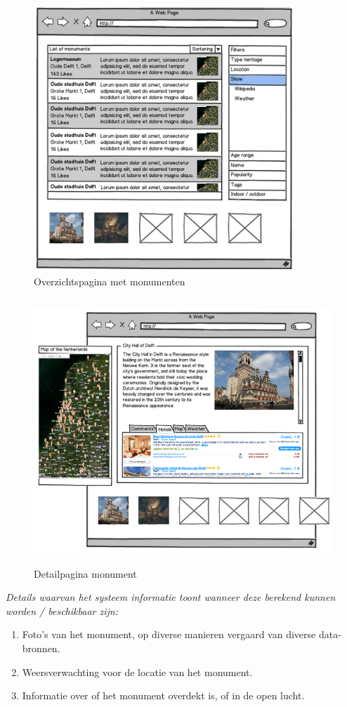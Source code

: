 \documentclass[a4paper,10pt]{article}
\begin{document}
			\begin{figure}[ht!]
				\centering
				\includegraphics[height=10cm]{interface2.png}
				\caption{Overzichtspagina met monumenten \label{interface2}}
			\end{figure}
			
			\begin{figure}[ht!]
				\centering
				\includegraphics[height=10cm]{interface3.png}
				\caption{Detailpagina monument \label{interface3}}
			\end{figure}
			\textit{Details waarvan het systeem informatie toont wanneer deze berekend kunnen worden / beschikbaar zijn:}
			\begin{enumerate}
				\item Foto's van het monument, op diverse manieren vergaard van diverse data-bronnen.
				\item Weersverwachting voor de locatie van het monument.
				\item Informatie over of het monument overdekt is, of in de open lucht.
			\end{enumerate}
	
\end{document}
